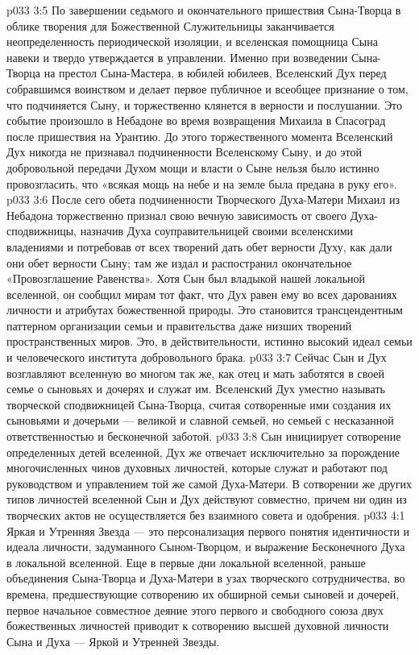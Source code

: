 \vs p033 3:5 По завершении седьмого и окончательного пришествия Сына\hyp{}Творца в облике творения для Божественной Служительницы заканчивается неопределенность периодической изоляции, и вселенская помощница Сына навеки и твердо утверждается в управлении. Именно при возведении Сына\hyp{}Творца на престол Сына\hyp{}Мастера, в юбилей юбилеев, Вселенский Дух перед собравшимся воинством и делает первое публичное и всеобщее признание о том, что подчиняется Сыну, и торжественно клянется в верности и послушании. Это событие произошло в Небадоне во время возвращения Михаила в Спасоград после пришествия на Урантию. До этого торжественного момента Вселенский Дух никогда не признавал подчиненности Вселенскому Сыну, и до этой добровольной передачи Духом мощи и власти о Сыне нельзя было истинно провозгласить, что «всякая мощь на небе и на земле была предана в руку его».
\vs p033 3:6 После сего обета подчиненности Творческого Духа\hyp{}Матери Михаил из Небадона торжественно признал свою вечную зависимость от своего Духа\hyp{}сподвижницы, назначив Духа соуправительницей своими вселенскими владениями и потребовав от всех творений дать обет верности Духу, как дали они обет верности Сыну; там же издал и распостранил окончательное «Провозглашение Равенства». Хотя Сын был владыкой нашей локальной вселенной, он сообщил мирам тот факт, что Дух равен ему во всех дарованиях личности и атрибутах божественной природы. Это становится трансцендентным паттерном организации семьи и правительства даже низших творений пространственных миров. Это, в действительности, истинно высокий идеал семьи и человеческого института добровольного брака.
\vs p033 3:7 Сейчас Сын и Дух возглавляют вселенную во многом так же, как отец и мать заботятся в своей семье о сыновьях и дочерях и служат им. Вселенский Дух уместно называть творческой сподвижницей Сына\hyp{}Творца, считая сотворенные ими создания их сыновьями и дочерьми --- великой и славной семьей, но семьей с несказанной ответственностью и бесконечной заботой.
\vs p033 3:8 \pc Сын инициирует сотворение определенных детей вселенной, Дух же отвечает исключительно за порождение многочисленных чинов духовных личностей, которые служат и работают под руководством и управлением той же самой Духа\hyp{}Матери. В сотворении же других типов личностей вселенной Сын и Дух действуют совместно, причем ни один из творческих актов не осуществляется без взаимного совета и одобрения.
\vs p033 4:1 Яркая и Утренняя Звезда --- это персонализация первого понятия идентичности и идеала личности, задуманного Сыном\hyp{}Творцом, и выражение Бесконечного Духа в локальной вселенной. Еще в первые дни локальной вселенной, раньше объединения Сына\hyp{}Творца и Духа\hyp{}Матери в узах творческого сотрудничества, во времена, предшествующие сотворению их обширной семьи сыновей и дочерей, первое начальное совместное деяние этого первого и свободного союза двух божественных личностей приводит к сотворению высшей духовной личности Сына и Духа --- Яркой и Утренней Звезды.
